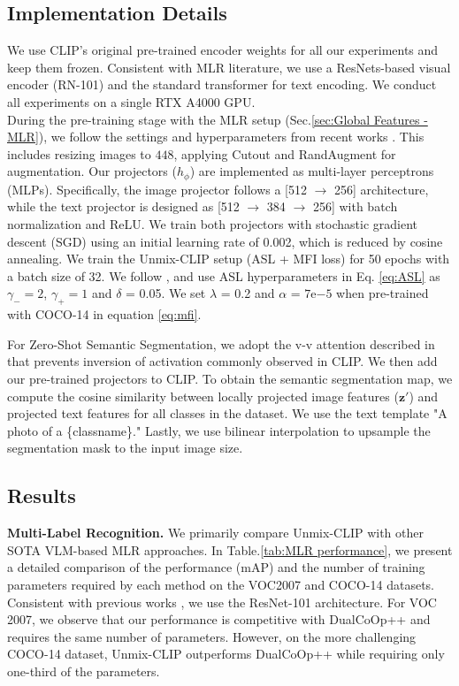 \subsection{Implementation Details}
We use CLIP's \cite{clip} original pre-trained encoder weights for all our experiments and keep them frozen. Consistent with MLR literature, we use a ResNets-based visual encoder (RN-101) and the standard transformer for text encoding. We conduct all experiments on a single RTX A4000 GPU.\\
During the pre-training stage with the MLR setup (Sec.\ref{sec:Global Features - MLR}), we follow the settings and hyperparameters from recent works \cite{dualcoop,MLR-GCN,PositiveCoOp}. This includes resizing images to $448$, applying Cutout \cite{cutout} and RandAugment \cite{randaug} for augmentation. 
% 
Our projectors ($h_{\phi}$) are implemented as multi-layer perceptrons (MLPs). Specifically, the image projector follows a [512 $\rightarrow$ 256] architecture, while the text projector is designed as [512 $\rightarrow$ 384 $\rightarrow$ 256] with batch normalization and ReLU. We train both projectors with stochastic gradient descent (SGD) using an initial learning rate of 0.002, which is reduced by cosine annealing. We train the Unmix-CLIP setup (ASL + MFI loss) for 50 epochs with a batch size of 32. We follow \cite{dualcoop,MLR-GCN,PositiveCoOp}, and use ASL hyperparameters in Eq. \ref{eq:ASL} as $\gamma_- = 2$, $\gamma_+ = 1$ and $\delta$ = 0.05. We set $\lambda$ = 0.2 and $\alpha$ = $7\mathrm{e}{-5}$ when pre-trained with COCO-14 in equation \ref{eq:mfi}. 

For Zero-Shot Semantic Segmentation, we adopt the v-v attention described in \cite{clip_surgery} that prevents inversion of activation commonly observed in CLIP. We then add our pre-trained projectors to CLIP.  To obtain the semantic segmentation map, we compute the cosine similarity between locally projected image features ($\mathbf{z'}$) and projected text features for all classes in the dataset. We use the text template "A photo of a \{classname\}." Lastly, we use bilinear interpolation to upsample the segmentation mask to the input image size.


\subsection{Results}
\label{sec: Results}
\textbf{Multi-Label Recognition.}
We primarily compare Unmix-CLIP with other SOTA VLM-based MLR approaches. In Table.\ref{tab:MLR performance}, we present a detailed comparison of the performance (mAP) and the number of training parameters required by each method on the VOC2007 \cite{pascal-voc} and COCO-14 \cite{coco} datasets. Consistent with previous works \cite{dualcoop,dualcoop++,MLR-GCN,PositiveCoOp,scpnet}, we use the ResNet-101 architecture. For VOC 2007, we observe that our performance is competitive with DualCoOp++\cite{dualcoop++} and requires the same number of parameters. However, on the more challenging COCO-14 dataset, Unmix-CLIP outperforms DualCoOp++ while requiring only one-third of the parameters. 
% 

